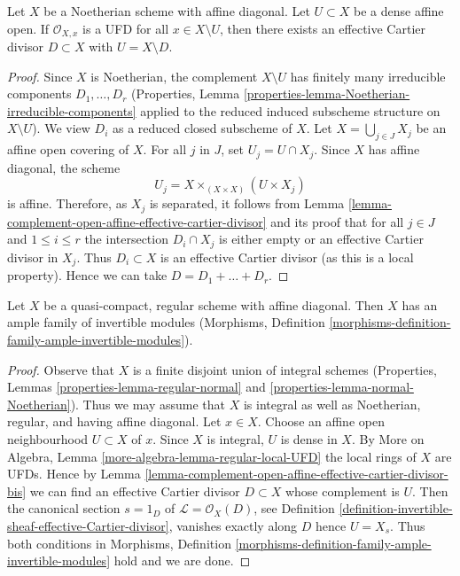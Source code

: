 \begin{lemma}
\label{lemma-complement-open-affine-effective-cartier-divisor-bis}
Let $X$ be a Noetherian scheme with affine diagonal. Let $U \subset X$ be
a dense affine open. If $\mathcal{O}_{X, x}$ is a UFD for all
$x \in X \setminus U$, then there exists an effective Cartier
divisor $D \subset X$ with $U = X \setminus D$.
\end{lemma}

\begin{proof}
Since $X$ is Noetherian, the complement $X \setminus U$ has finitely
many irreducible components $D_1, \ldots, D_r$
(Properties, Lemma \ref{properties-lemma-Noetherian-irreducible-components}
applied to the reduced induced subscheme structure on $X \setminus U$).
We view $D_i$ as a reduced closed subscheme of $X$.
Let $X = \bigcup_{j \in J} X_j$ be an affine open covering of $X$. For all
$j$ in $J$, set $U_j = U \cap X_j$. Since $X$ has affine diagonal,
the scheme
$$
U_j = X \times_{(X \times X)} (U \times X_j)
$$
is affine. Therefore, as $X_j$ is separated, it follows from
Lemma \ref{lemma-complement-open-affine-effective-cartier-divisor}
and its proof that for all $j \in J$ and $1 \leq i \leq r$ the
intersection $D_i \cap X_j$ is either empty or an
effective Cartier divisor in $X_j$.
Thus $D_i \subset X$ is an effective Cartier divisor (as this is
a local property). Hence we can take $D = D_1 + \ldots + D_r$.
\end{proof}

\begin{lemma}
\label{lemma-regular-ample-family}
Let $X$ be a quasi-compact, regular scheme with affine diagonal.
Then $X$ has an ample family of invertible modules
(Morphisms, Definition
\ref{morphisms-definition-family-ample-invertible-modules}).
\end{lemma}

\begin{proof}
Observe that $X$ is a finite disjoint union of integral schemes
(Properties, Lemmas
\ref{properties-lemma-regular-normal} and
\ref{properties-lemma-normal-Noetherian}).
Thus we may assume that $X$ is integral as well as Noetherian,
regular, and having affine diagonal. Let $x \in X$.
Choose an affine open neighbourhood $U \subset X$ of $x$.
Since $X$ is integral, $U$ is dense in $X$.
By More on Algebra, Lemma \ref{more-algebra-lemma-regular-local-UFD}
the local rings of $X$ are UFDs. Hence by Lemma
\ref{lemma-complement-open-affine-effective-cartier-divisor-bis}
we can find an effective Cartier divisor $D \subset X$
whose complement is $U$. Then the canonical section
$s = 1_D$ of $\mathcal{L} = \mathcal{O}_X(D)$,
see Definition \ref{definition-invertible-sheaf-effective-Cartier-divisor},
vanishes exactly along $D$ hence $U = X_s$.
Thus both conditions in Morphisms, Definition
\ref{morphisms-definition-family-ample-invertible-modules}
hold and we are done.
\end{proof}




